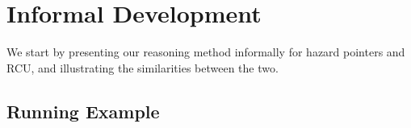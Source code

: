 %
%

\section{Informal Development\label{sec:informal}}

We start by presenting our reasoning method informally for hazard pointers and
RCU, and illustrating the similarities between the two.

\subsection{Running Example}


